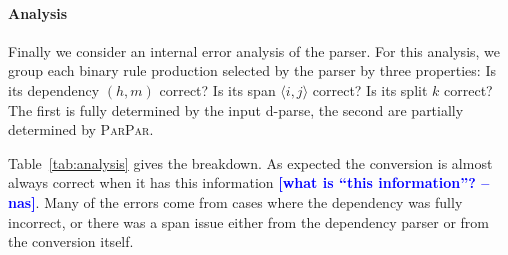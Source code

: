 \documentclass[11pt,letterpaper]{article}
\newcommand{\Span}[1]{\langle #1 \rangle}
\newcommand{\ParseName}{\textsc{ParPar}\xspace}
\newcommand{\nascomment}[1]{\textcolor{blue}{\bf \small [#1 --nas]}}
\begin{document}



\paragraph{Analysis}
\label{sec:analysis}
Finally we consider an internal error analysis of
the parser. For this analysis, we group each binary rule production
selected by the parser by three properties:
Is its dependency $(h, m)$ correct? Is its span $\Span{i,j}$ correct? 
Is its split $k$ correct? The first is fully determined by the 
input d-parse, the second are partially determined by \ParseName.

Table~\ref{tab:analysis} gives the breakdown. As expected the conversion 
is almost always correct when it has this information \nascomment{what
  is ``this information''?}. Many of 
the errors come from cases where the dependency was fully 
incorrect, or there was a span issue either from the dependency 
parser or from the conversion itself.





\end{document}
